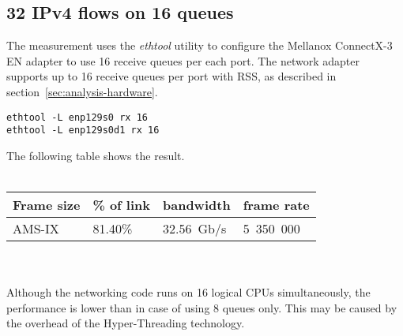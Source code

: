 
\subsection{32 IPv4 flows on 16 queues}
The measurement uses the {\it{ethtool}} utility to configure the Mellanox ConnectX-3 EN adapter to use
16 receive queues per each port.
The network adapter supports up to 16 receive queues per port with RSS,
as described in section~\ref{sec:analysis-hardware}.
\begin{lstlisting}
ethtool -L enp129s0 rx 16
ethtool -L enp129s0d1 rx 16
\end{lstlisting}
The following table shows the result.
\\
\\
\begin{tabular}{ | l | l | l | l | }
\hline
Frame size & \% of link & bandwidth & frame rate \\
\hline
AMS-IX & 81.40\% & 32.56~Gb/s & 5~350~000 \\
\hline
\end{tabular}
\\
\\
Although the networking code runs on 16 logical CPUs simultaneously,
the performance is lower than in case of using 8 queues only.
This may be caused by the overhead of the Hyper-Threading technology.
